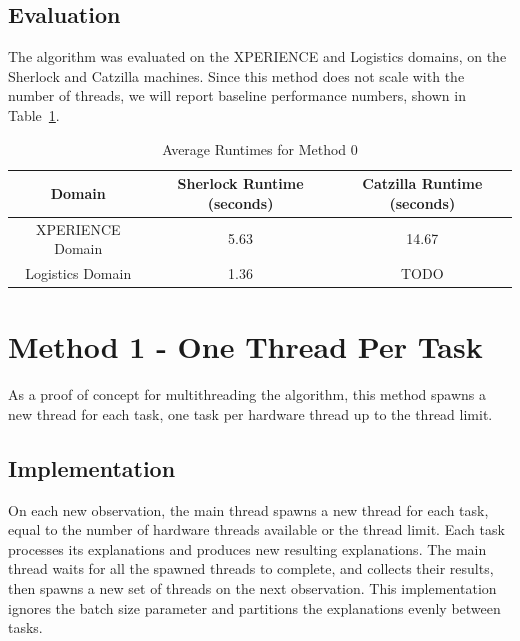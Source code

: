 \documentclass[12pt,twoside,abbrevs,msc,ai,notimes,logo,sansheadings]{infthesis}
\begin{document}
  \section{Evaluation}
  
  The algorithm was evaluated on the XPERIENCE and Logistics domains, on the Sherlock and Catzilla machines. Since this method does not scale with the number of threads, we will report baseline performance numbers, shown in Table~\ref{tab:m0}.
  
  \begin{table}[!htbp]
  \begin{tabular}{c c c}
  Domain & Sherlock Runtime (seconds) & Catzilla Runtime (seconds)\tabularnewline
  \hline
  XPERIENCE Domain & 5.63 & 14.67\tabularnewline
  Logistics Domain & 1.36 & TODO\tabularnewline
  \hline
  \end{tabular}
  \caption{Average Runtimes for Method 0}
  \label{tab:m0}
  \end{table}

  \chapter {Method 1 - One Thread Per Task}
  
  As a proof of concept for multithreading the algorithm, this method spawns a new thread for each task, one task per hardware thread up to the thread limit.
  
  \section {Implementation}
  
  On each new observation,  the main thread spawns a new thread for each task, equal to the number of hardware threads available or the thread limit. Each task processes its explanations and produces new resulting explanations. The main thread waits for all the spawned threads to complete, and collects their results, then spawns a new set of threads on the next observation. This implementation ignores the batch size parameter and partitions the explanations evenly between tasks.
  
\end{document}
